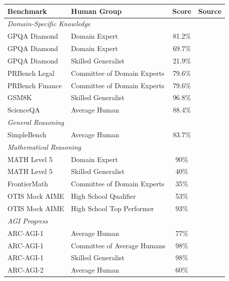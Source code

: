\documentclass[letterpaper,twocolumn]{article}
\begin{document}
\begin{table}[ht]
\centering
\small
\begin{tabular}{llcl}
\toprule
\textbf{Benchmark} & \textbf{Human Group} & \textbf{Score} & \textbf{Source} \\
\midrule
\multicolumn{4}{l}{\textit{Domain-Specific Knowledge}} \\
GPQA Diamond & Domain Expert & 81.2\% & \citet{rein_gpqa_2023} \\
GPQA Diamond & Domain Expert & 69.7\% & \citet{openai_learning_2024}\\
GPQA Diamond & Skilled Generalist & 21.9\% & \citet{rein_gpqa_2023} \\
PRBench Legal & Committee of Domain Experts& 79.6\% & \citet{akyurek_prbench_2025} \\
PRBench Finance & Committee of Domain Experts& 79.6\% & \citet{akyurek_prbench_2025} \\
GSM8K & Skilled Generalist & 96.8\% & \citet{li_gsm-plus_2024} \\
ScienceQA & Average Human & 88.4\% & \citet{lu_learn_2022} \\
\midrule
\multicolumn{4}{l}{\textit{General Reasoning}} \\
SimpleBench & Average Human & 83.7\% & \citet{philip_simplebench_2024} \\
\midrule
\multicolumn{4}{l}{\textit{Mathematical Reasoning}} \\
MATH Level 5 & Domain Expert & 90\% & \citet{hendrycks_measuring_2021} \\
MATH Level 5 & Skilled Generalist & 40\% & \citet{hendrycks_measuring_2021} \\
FrontierMath & Committee of Domain Experts& 35\% & \citet{epoch_ai_frontiermath_2025} \\
OTIS Mock AIME & High School Qualifier& 53\% & \citet{chen_otis_2025} \\
OTIS Mock AIME & High School Top Performer& 93\% & \citet{chen_otis_2025} \\
\midrule
\multicolumn{4}{l}{\textit{AGI Progress}} \\
ARC-AGI-1 & Average Human & 77\% & \citet{arc_prize_arc-agi-1_2019} \\
ARC-AGI-1 & Committee of Average Humans & 98\% & \citet{arc_prize_arc-agi-1_2019} \\
ARC-AGI-1 & Skilled Generalist & 98\% & \citet{arc_prize_arc-agi-1_2019} \\
ARC-AGI-2 & Average Human & 60\% & \citet{arc_prize_arc-agi-2_2025} \\

\end{tabular}
\end{table}
\end{document}
